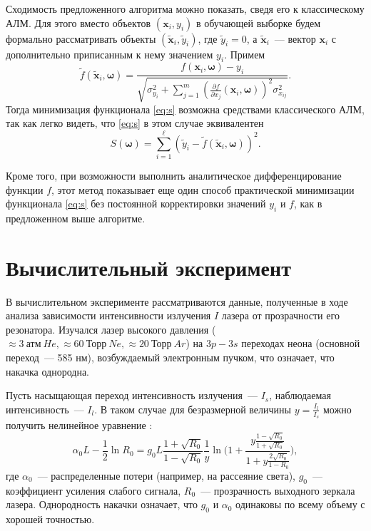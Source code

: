 \documentclass[11pt,a4paper]{article}
\newcommand{\bomega}{\boldsymbol{\omega}}
\begin{document}
Сходимость предложенного алгоритма можно показать, сведя его к классическому АЛМ. Для этого
вместо объектов $(\mathbf{x}_i, y_i)$ в обучающей выборке будем формально рассматривать
объекты $(\tilde{\mathbf{x}}_i, \tilde{y}_i)$, где $\tilde{y}_i = 0$, а
$\tilde{\mathbf{x}}_i$~--- вектор $\mathbf{x}_i$ с дополнительно приписанным к нему
значением $y_i$. Примем
\[
  \tilde{f}(\tilde{\mathbf{x}}_i, \bomega) = \frac{f(\mathbf{x}_i, \bomega) - y_i}{\sqrt{\sigma_{y_i}^2 + \sum_{j = 1}^m (\frac{\partial f}{\partial x_j}(\mathbf{x}_i, \bomega))^2 \sigma^2_{x_{ij}}}}.
\]
Тогда минимизация функционала \eqref{eq:s} возможна средствами классического АЛМ, так
как легко видеть, что \eqref{eq:s} в этом случае эквивалентен
\[
  S(\bomega) = \sum_{i = 1}^\ell (\tilde{y}_i - \tilde{f}(\tilde{\mathbf{x}}_i, \bomega))^2.
\]

Кроме того, при возможности выполнить аналитическое дифференцирование функции $f$, этот
метод показывает еще один способ практической минимизации функционала \eqref{eq:s} без
постоянной корректировки значений $y_i$ и $f$, как в предложенном выше алгоритме.

\section{Вычислительный эксперимент}

В вычислительном эксперименте рассматриваются данные, полученные в ходе анализа
зависимости интенсивности излучения $I$ лазера от прозрачности его резонатора.
Изучался лазер высокого давления ($\approx 3\ \text{атм}\ He, \approx 60\ \text{Торр}\ Ne, \approx 20\ \text{Торр}\ Ar$) на
$3p-3s$ переходах неона (основной переход~--- 585 нм), возбуждаемый электронным пучком,
что означает, что накачка однородна.

Пусть насыщающая переход интенсивность излучения~--- $I_s$, наблюдаемая интенсивность~---
$I_l$. В таком случае для безразмерной величины $y = \frac{I_l}{I_s}$ можно получить 
нелинейное уравнение \cite{...}:
\begin{equation}
  \alpha_0 L - \frac{1}{2} \ln R_0 = g_0 L \frac{1 + \sqrt{R_0}}{1 - \sqrt{R_0}} \frac{1}{y} \ln \Big( 1 + \frac{y \frac{1 - \sqrt{R_0}}{1 + \sqrt{R_0}}}{1 + y \frac{2 \sqrt{R_0}}{1 - R_0}} \Big),
  \label{eq:y_exact}
\end{equation}
где $\alpha_0$~--- распределенные потери (например, на рассеяние света),
$g_0$~--- коэффициент усиления слабого сигнала, $R_0$~--- прозрачность выходного
зеркала лазера. Однородность накачки означает, что $g_0$ и $\alpha_0$ одинаковы по
всему объему с хорошей точностью.
\end{document}
